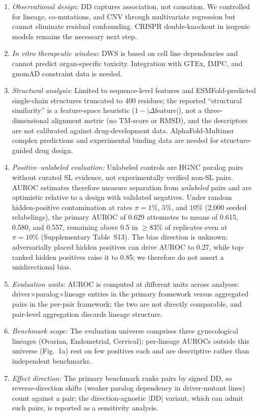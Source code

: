 \documentclass[11pt,a4paper]{article}
\begin{document}
\begin{enumerate}
\item \textit{Observational design:} DD captures association, not causation. We controlled for lineage, co-mutations, and CNV through multivariate regression but cannot eliminate residual confounding. CRISPR double-knockout in isogenic models remains the necessary next step.
\item \textit{In vitro therapeutic window:} DWS is based on cell line dependencies and cannot predict organ-specific toxicity. Integration with GTEx, IMPC, and gnomAD constraint data is needed.
\item \textit{Structural analysis:} Limited to sequence-level features and ESMFold-predicted single-chain structures truncated to 400 residues; the reported ``structural similarity'' is a feature-space heuristic ($1 - \overline{|\Delta\text{feature}|}$), not a three-dimensional alignment metric (no TM-score or RMSD), and the descriptors are not calibrated against drug-development data. AlphaFold-Multimer complex predictions and experimental binding data are needed for structure-guided drug design.
\item \textit{Positive--unlabeled evaluation:} Unlabeled controls are HGNC paralog pairs without curated SL evidence, not experimentally verified non-SL pairs. AUROC estimates therefore measure separation from \textit{unlabeled} pairs and are optimistic relative to a design with validated negatives. Under random hidden-positive contamination at rates $\pi=1\%$, $5\%$, and $10\%$ (2,000 seeded relabelings), the primary AUROC of 0.629 attenuates to means of 0.615, 0.580, and 0.557, remaining above 0.5 in $\ge$83\% of replicates even at $\pi=10\%$ (Supplementary Table~S13). The bias direction is unknown: adversarially placed hidden positives can drive AUROC to 0.27, while top-ranked hidden positives raise it to 0.85; we therefore do not assert a unidirectional bias.
\item \textit{Evaluation units:} AUROC is computed at different units across analyses: driver$\times$paralog$\times$lineage entries in the primary framework versus aggregated pairs in the per-pair framework; the two are not directly comparable, and pair-level aggregation discards lineage structure.
\item \textit{Benchmark scope:} The evaluation universe comprises three gynecological lineages (Ovarian, Endometrial, Cervical); per-lineage AUROCs outside this universe (Fig.~1a) rest on few positives each and are descriptive rather than independent benchmarks.
\item \textit{Effect direction:} The primary benchmark ranks pairs by signed DD, so reverse-direction shifts (weaker paralog dependency in driver-mutant lines) count against a pair; the direction-agnostic $|$DD$|$ variant, which can admit such pairs, is reported as a sensitivity analysis.

\end{enumerate}
\end{document}
